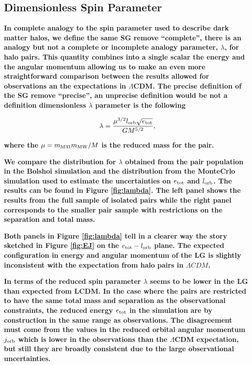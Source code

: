 \documentclass{emulateapj}
\begin{document}
\subsection{Dimensionless Spin Parameter}

{\bf In complete analogy to the spin parameter used to describe dark matter halos, we define the same
SG remove ``complete'',  there is an analogy but not a complete or incomplete analogy 
 parameter, $\lambda$, for halo pairs. This quantity combines into a single scalar the energy and the angular momentum allowing us to make an even more straightforward comparison between the results allowed for observations an the expectations in $\Lambda$CDM. The precise definition of the
SG remove ``precise'',  an unprecise definition would be not a definition
 dimensionless $\lambda$ parameter is the following
}

\begin{equation}
\lambda = \frac{\mu^{3/2} l_{\rm orb} \sqrt{e_{\rm tot}}}{G M^{5/2}}, 
\end{equation}

{\bf where the $\mu=m_{\rm M31}m_{\rm MW}/M$ is the reduced mass for the pair.}


{\bf We compare the distribution for  $\lambda$ obtained from the pair population in the Bolshoi simulation and the distribution from the MonteCrlo simulation used to estimate the uncertainties on $e_{\rm tot}$ and $l_{\rm orb}$. The results can be found in Figure \ref{fig:lambda}. The left panel shows the results from the full sample of isolated pairs while the right panel corresponds to the smaller pair sample with restrictions on the separation and total mass. }

{\bf Both panels in Figure \ref{fig:lambda} tell in a clearer way the story sketched in Figure \ref{fig:EJ} on the $e_{\rm tot}-l_{\rm orb}$ plane. The expected configuration in energy and angular momentum of the LG is slightly inconsistent with the expectation from halo pairs in $\Lambda CDM$. }

{\bf In terms of the reduced spin parameter $\lambda$ seems to be lower in the LG than expected from LCDM. In the case where the pairs are restricted to have the same total mass and separation as the observational constraints, the reduced energy $e_{\rm tot }$ in the simulation are by construction in the same range as observations. The disagreement must come from the values in the reduced orbital angular momentum $j_{\rm orb}$ which is lower in the observations than the $\Lambda$CDM expectation, but still they are broadly consistent due to the large observational uncertainties.}
\end{document}
